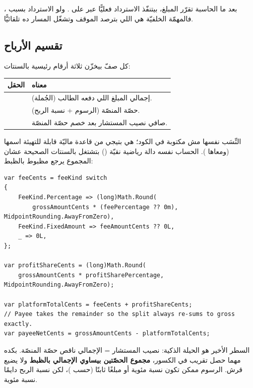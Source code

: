 بعد ما الحاسبة تقرّر المبلغ، بيتنفّذ الاسترداد فعليًّا عبر 
على . ولو الاسترداد بسبب ، فالمهمّة الخلفيّة
 هي اللي بترصد الموقف وتشغّل المسار ده تلقائيًّا.

\subsection{تقسيم الأرباح}

كل صفّ  بيخزّن ثلاثة أرقام رئيسية بالسنتات:

\begin{center}
\begin{tabular}{L{4.4cm} L{8.4cm}}
\toprule
\textbf{\color{spPrimary}الحقل} & \textbf{\color{spPrimary}معناه} \\
\midrule
{} & إجمالي المبلغ اللي دفعه الطالب (الجُملة). \\
 & حصّة المنصّة (الرسوم + نسبة الربح). \\
 & صافي نصيب المستشار بعد خصم حصّة المنصّة. \\
\bottomrule
\end{tabular}
\end{center}

النِّسَب نفسها مش مكتوبة في الكود؛ هي بتيجي من قاعدة ماليّة قابلة للتهيئة اسمها
 (ومعاها ). الحساب نفسه دالة
رياضية نقيّة () بتشتغل بالسنتات الصحيحة عشان المجموع يرجع
مظبوط بالظبط:

\begin{english}
\begin{lstlisting}[language={[Sharp]C}]
var feeCents = feeKind switch
{
    FeeKind.Percentage => (long)Math.Round(
        grossAmountCents * (feePercentage ?? 0m), MidpointRounding.AwayFromZero),
    FeeKind.FixedAmount => feeAmountCents ?? 0L,
    _ => 0L,
};

var profitShareCents = (long)Math.Round(
    grossAmountCents * profitSharePercentage, MidpointRounding.AwayFromZero);

var platformTotalCents = feeCents + profitShareCents;
// Payee takes the remainder so the split always re-sums to gross exactly.
var payeeNetCents = grossAmountCents - platformTotalCents;
\end{lstlisting}
\end{english}

السطر الأخير هو الحيلة الذكية: نصيب المستشار = الإجمالي ناقص حصّة المنصّة.
بكده مهما حصل تقريب في الكسور، \textbf{مجموع الحصّتين بيساوي الإجمالي بالظبط}
ولا يضيع قرش. الرسوم ممكن تكون نسبة مئوية أو مبلغًا ثابتًا (حسب )،
لكن نسبة الربح دايمًا نسبة مئوية.


